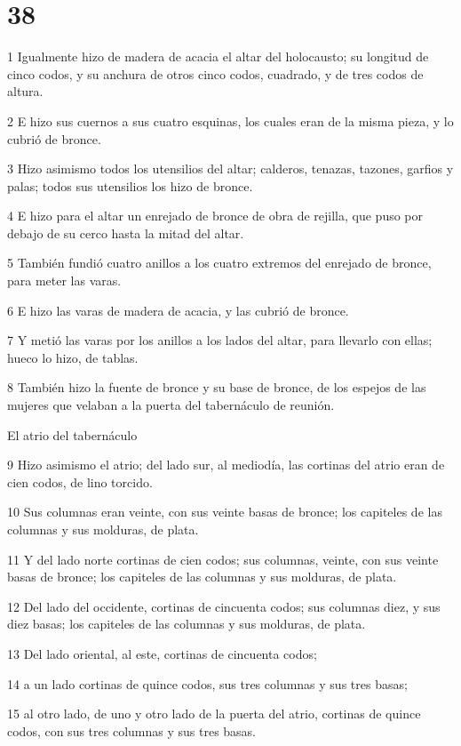 \chapter{38}

\par 1 Igualmente hizo de madera de acacia el altar del holocausto; su longitud de cinco codos, y su anchura de otros cinco codos, cuadrado, y de tres codos de altura.
\par 2 E hizo sus cuernos a sus cuatro esquinas, los cuales eran de la misma pieza, y lo cubrió de bronce.
\par 3 Hizo asimismo todos los utensilios del altar; calderos, tenazas, tazones, garfios y palas; todos sus utensilios los hizo de bronce.
\par 4 E hizo para el altar un enrejado de bronce de obra de rejilla, que puso por debajo de su cerco hasta la mitad del altar.
\par 5 También fundió cuatro anillos a los cuatro extremos del enrejado de bronce, para meter las varas.
\par 6 E hizo las varas de madera de acacia, y las cubrió de bronce.
\par 7 Y metió las varas por los anillos a los lados del altar, para llevarlo con ellas; hueco lo hizo, de tablas.
\par 8 También hizo la fuente de bronce y su base de bronce, de los espejos de las mujeres que velaban a la puerta del tabernáculo de reunión.
\par El atrio del tabernáculo
\par 9 Hizo asimismo el atrio; del lado sur, al mediodía, las cortinas del atrio eran de cien codos, de lino torcido.
\par 10 Sus columnas eran veinte, con sus veinte basas de bronce; los capiteles de las columnas y sus molduras, de plata.
\par 11 Y del lado norte cortinas de cien codos;  sus columnas, veinte, con sus veinte basas de bronce; los capiteles de las columnas y sus molduras, de plata.
\par 12 Del lado del occidente, cortinas de cincuenta codos;  sus columnas diez, y sus diez basas; los capiteles de las columnas y sus molduras, de plata.
\par 13 Del lado oriental, al este, cortinas de cincuenta codos;
\par 14 a un lado cortinas de quince codos,  sus tres columnas y sus tres basas;
\par 15 al otro lado, de uno y otro lado de la puerta del atrio, cortinas de quince codos,  con sus tres columnas y sus tres basas.
